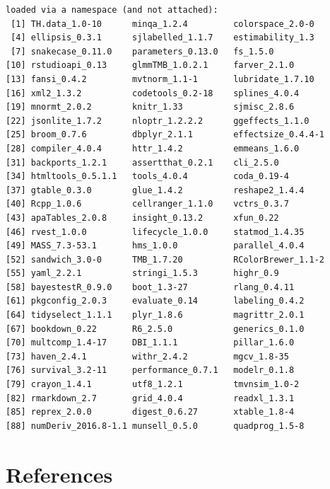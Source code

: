 \documentclass[
  english,
]{book}
\begin{document}
\begin{verbatim}
loaded via a namespace (and not attached):
 [1] TH.data_1.0-10      minqa_1.2.4         colorspace_2.0-0   
 [4] ellipsis_0.3.1      sjlabelled_1.1.7    estimability_1.3   
 [7] snakecase_0.11.0    parameters_0.13.0   fs_1.5.0           
[10] rstudioapi_0.13     glmmTMB_1.0.2.1     farver_2.1.0       
[13] fansi_0.4.2         mvtnorm_1.1-1       lubridate_1.7.10   
[16] xml2_1.3.2          codetools_0.2-18    splines_4.0.4      
[19] mnormt_2.0.2        knitr_1.33          sjmisc_2.8.6       
[22] jsonlite_1.7.2      nloptr_1.2.2.2      ggeffects_1.1.0    
[25] broom_0.7.6         dbplyr_2.1.1        effectsize_0.4.4-1 
[28] compiler_4.0.4      httr_1.4.2          emmeans_1.6.0      
[31] backports_1.2.1     assertthat_0.2.1    cli_2.5.0          
[34] htmltools_0.5.1.1   tools_4.0.4         coda_0.19-4        
[37] gtable_0.3.0        glue_1.4.2          reshape2_1.4.4     
[40] Rcpp_1.0.6          cellranger_1.1.0    vctrs_0.3.7        
[43] apaTables_2.0.8     insight_0.13.2      xfun_0.22          
[46] rvest_1.0.0         lifecycle_1.0.0     statmod_1.4.35     
[49] MASS_7.3-53.1       hms_1.0.0           parallel_4.0.4     
[52] sandwich_3.0-0      TMB_1.7.20          RColorBrewer_1.1-2 
[55] yaml_2.2.1          stringi_1.5.3       highr_0.9          
[58] bayestestR_0.9.0    boot_1.3-27         rlang_0.4.11       
[61] pkgconfig_2.0.3     evaluate_0.14       labeling_0.4.2     
[64] tidyselect_1.1.1    plyr_1.8.6          magrittr_2.0.1     
[67] bookdown_0.22       R6_2.5.0            generics_0.1.0     
[70] multcomp_1.4-17     DBI_1.1.1           pillar_1.6.0       
[73] haven_2.4.1         withr_2.4.2         mgcv_1.8-35        
[76] survival_3.2-11     performance_0.7.1   modelr_0.1.8       
[79] crayon_1.4.1        utf8_1.2.1          tmvnsim_1.0-2      
[82] rmarkdown_2.7       grid_4.0.4          readxl_1.3.1       
[85] reprex_2.0.0        digest_0.6.27       xtable_1.8-4       
[88] numDeriv_2016.8-1.1 munsell_0.5.0       quadprog_1.5-8     
\end{verbatim}

\hypertarget{refs}{%
\chapter*{References}\label{refs}}

  
\end{document}

